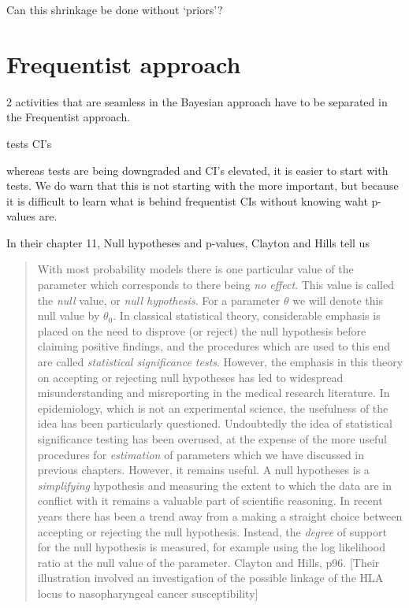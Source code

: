 \documentclass[]{book}
\begin{document}
Can this shrinkage be done without `priors'?

\hypertarget{frequentist-approach}{%
\section{Frequentist approach}\label{frequentist-approach}}

2 activities that are seamless in the Bayesian approach have to be separated in the Frequentist approach.

tests CI's

whereas tests are being downgraded and CI's elevated,
it is easier to start with tests. We do warn that this is not starting with the more important, but because it is difficult to learn what is behind frequentist CIs without knowing waht p-values are.

In their chapter 11, Null hypotheses and p-values, Clayton and Hills tell us

\begin{quote}
With most probability models there is one particular value of the parameter which corresponds to there being \emph{no effect}. This value is called the \emph{null} value, or \emph{null hypothesis}. For a parameter \(\theta\) we will denote this null value by \(\theta_0\). In classical statistical theory, considerable emphasis is placed on the need to disprove (or reject) the null hypothesis before claiming positive findings, and the procedures which are used to this end are called \emph{statistical significance tests}. However, the emphasis in this theory on accepting or
rejecting null hypotheses has led to widespread misunderstanding and misreporting in the medical research literature. In epidemiology, which is not an
experimental science, the usefulness of the idea has been particularly questioned. Undoubtedly the idea of statistical significance testing has been overused, at the expense of the more useful procedures for \emph{estimation}
of parameters which we have discussed in previous chapters. However, it remains useful. A null hypotheses is a \emph{simplifying} hypothesis and measuring the extent to which the data are in conflict with it remains a valuable part of scientific reasoning. In recent years there has been a trend away from a making a straight choice between accepting or rejecting the null
hypothesis. Instead, the \emph{degree} of support for the null hypothesis is measured, for example using the log likelihood ratio at the null value of the
parameter. Clayton and Hills, p96. {[}Their illustration involved an investigation of the possible linkage of the HLA locus to nasopharyngeal cancer susceptibility{]}
\end{quote}
\end{document}
